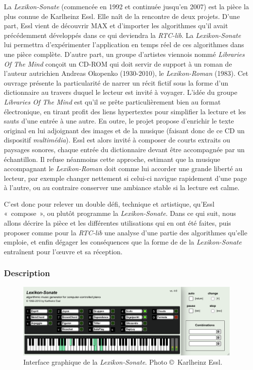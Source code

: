 \documentclass[a4paper,12pt]{article}
\newcommand{\guill}[1]{«~#1~»}
\begin{document}
La \emph{Lexikon-Sonate} (commencée en 1992 et continuée jusqu'en 2007) est la pièce la plus connue de Karlheinz Essl. Elle naît de la rencontre de deux projets. D'une part, Essl vient de découvrir MAX et d'importer les algorithmes qu'il avait précédemment développés dans ce qui deviendra la \emph{RTC-lib}. La \emph{Lexikon-Sonate} lui permettra d'expérimenter l'application en temps réel de ces algorithmes dans une pièce complète. D'autre part, un groupe d'artistes viennois nommé \emph{Libraries Of The Mind} conçoit un CD-ROM qui doit servir de support à un roman de l'auteur autrichien Andreas Okopenko (1930-2010), le \emph{Lexikon-Roman} (1983). Cet ouvrage présente la particularité de narrer un récit fictif sous la forme d'un dictionnaire au travers duquel le lecteur est invité à voyager. L'idée du groupe \emph{Libraries Of The Mind} est qu'il se prête particulièrement bien au format électronique, en tirant profit des liens hypertextes pour simplifier la lecture et les sauts d'une entrée à une autre. En outre, le projet propose d'enrichir le texte original en lui adjoignant des images et de la musique (faisant donc de ce CD un dispositif \emph{multimédia}). Essl est alors invité à composer de courts extraits ou paysages sonores, chaque entrée du dictionnaire devant être accompagnée par un échantillon. Il refuse néanmoins cette approche, estimant que la musique accompagnant le \emph{Lexikon-Roman} doit comme lui accorder une grande liberté au lecteur, par exemple changer nettement si celui-ci navigue rapidement d'une page à l'autre, ou au contraire conserver une ambiance stable si la lecture est calme.

C'est donc pour relever un double défi, technique et artistique, qu'Essl \guill{compose}, ou plutôt programme la \emph{Lexikon-Sonate}. Dans ce qui suit, nous allons décrire la pièce et les différentes utilisations qui en ont été faites, puis proposer comme pour la \emph{RTC-lib} une analyse d'une partie des algorithmes qu'elle emploie, et enfin dégager les conséquences que la forme de de la \emph{Lexikon-Sonate} entraînent pour l'œuvre et sa réception.

\subsubsection{Description}

\begin{figure}[!h]
\begin{center}
\includegraphics[width=\textwidth]{images/lexson.png}
\caption{\footnotesize Interface graphique de la \emph{Lexikon-Sonate}. Photo \copyright~Karlheinz Essl.}
\label{lsinterface}
\end{center}
\end{figure}
\end{document}
